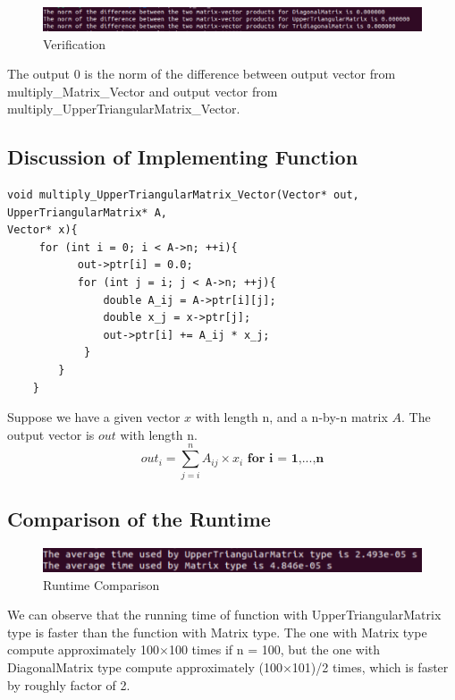 \documentclass[10pt,a4paper]{article}
\begin{document}
\begin{figure}[!ht]
        \centering \includegraphics[scale=0.8]{figures/verification.png}
        \caption{Verification}
\end{figure}

The output 0 is the norm of the difference between output vector from multiply\_Matrix\_Vector and output vector from multiply\_UpperTriangularMatrix\_Vector.

\subsection{Discussion of Implementing Function}

\begin{lstlisting}[]
void multiply_UpperTriangularMatrix_Vector(Vector* out, UpperTriangularMatrix* A, 
Vector* x){  
     for (int i = 0; i < A->n; ++i){    
           out->ptr[i] = 0.0;    
           for (int j = i; j < A->n; ++j){      
               double A_ij = A->ptr[i][j];      
               double x_j = x->ptr[j];      
               out->ptr[i] += A_ij * x_j;    
            }  
        }
    }
\end{lstlisting}

Suppose we have a given vector $x$ with length n, and a n-by-n matrix $A$. The output vector is $out$ with length n. 
\[
    out_{i} = \sum_{j=i}^n A_{ij} \times x_{i} \textbf{ for i = 1,...,n}
\]

\subsection{Comparison of the Runtime}
\begin{figure}[!ht]
        \centering \includegraphics[scale=1]{figures/uppertri runtime.png}
        \caption{Runtime Comparison}
\end{figure}

We can observe that the running time of function with UpperTriangularMatrix type is faster than the function with Matrix type. The one with Matrix type compute approximately 100$\times$100 times if n = 100, but the one with DiagonalMatrix type compute approximately (100$\times$101)/2 times, which is faster by roughly factor of 2. 
\end{document}
